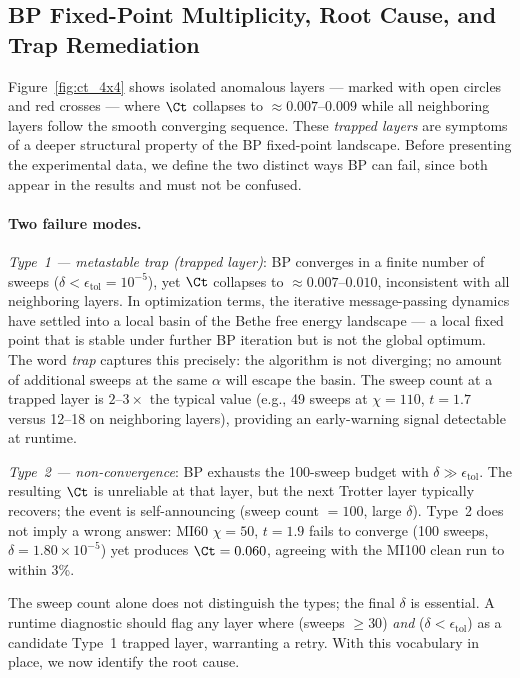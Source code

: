 \subsection{BP Fixed-Point Multiplicity, Root Cause, and Trap Remediation}
\label{sec:bp_convergence}

Figure~\ref{fig:ct_4x4} shows isolated anomalous layers --- marked with open circles
and red crosses --- where $\Ct$ collapses to $\approx 0.007$--$0.009$ while all
neighboring layers follow the smooth converging sequence.
These \emph{trapped layers} are symptoms of a deeper structural property of the
BP fixed-point landscape.
Before presenting the experimental data, we define the two distinct ways BP can
fail, since both appear in the results and must not be confused.

\paragraph{Two failure modes.}
\emph{Type~1 --- metastable trap (trapped layer)}: BP converges in a finite
number of sweeps ($\delta < \epsilon_{\mathrm{tol}} = 10^{-5}$), yet $\Ct$
collapses to $\approx 0.007$--$0.010$, inconsistent with all neighboring layers.
In optimization terms, the iterative message-passing dynamics have settled into
a local basin of the Bethe free energy landscape --- a local fixed point that is
stable under further BP iteration but is not the global optimum.
The word \emph{trap} captures this precisely: the algorithm is not diverging;
no amount of additional sweeps at the same $\alpha$ will escape the basin.
The sweep count at a trapped layer is $2$--$3\times$ the typical value
(e.g., 49 sweeps at $\chi=110$, $t=1.7$ versus 12--18 on neighboring layers),
providing an early-warning signal detectable at runtime.

\emph{Type~2 --- non-convergence}: BP exhausts the 100-sweep budget with
$\delta \gg \epsilon_{\mathrm{tol}}$.
The resulting $\Ct$ is unreliable at that layer, but the next Trotter layer
typically recovers; the event is self-announcing (sweep count $= 100$, large
$\delta$).
Type~2 does not imply a wrong answer: MI60 $\chi=50$, $t=1.9$ fails to
converge (100 sweeps, $\delta = 1.80\times10^{-5}$) yet produces $\Ct = 0.060$,
agreeing with the MI100 clean run to within 3\%.

The sweep count alone does not distinguish the types; the final $\delta$ is
essential.
A runtime diagnostic should flag any layer where (sweeps $\geq 30$) \emph{and}
($\delta < \epsilon_{\mathrm{tol}}$) as a candidate Type~1 trapped layer,
warranting a retry.
With this vocabulary in place, we now identify the root cause.

